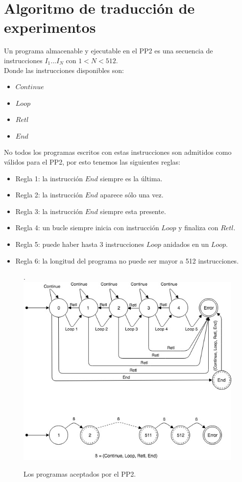 \section{Algoritmo de traducci\'on de experimentos}

Un programa almacenable y ejecutable en el PP2 es una secuencia de 
instrucciones \(I_{1} ... I_{N}\) con \(1 < N < 512 \).
\\
Donde las instrucciones disponibles son:

\begin{itemize}
    \item $Continue$
    \item $Loop$
    \item $Retl$
    \item $End$
\end{itemize}

\noindent
No todos los programas escritos con estas instrucciones son admitidos 
como v\'alidos para el PP2, por esto tenemos las siguientes reglas:

\begin{itemize}
\item Regla 1: la instrucci\'on $End$ siempre es la \'ultima.
\item Regla 2: la instrucci\'on $End$ aparece s\'olo una vez.
\item Regla 3: la instrucci\'on $End$ siempre esta presente.
\item Regla 4: un bucle siempre inicia con instrucci\'on $Loop$ y finaliza con $Retl$.
\item Regla 5: puede haber hasta 3 instrucciones $Loop$ anidados en un $Loop$.
\item Regla 6: la longitud del programa no puede ser mayor a 512 instrucciones.
\end{itemize}

\begin{figure}[!htb].
    \includegraphics[width=\linewidth]{../figures/d12.jpg}
    \caption{Los programas aceptados por el PP2.}
    \label{fig:d12}
\end{figure}
 
